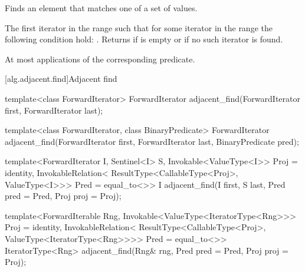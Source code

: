 \begin{itemdescr}
\pnum
\effects
Finds an element that matches one of a set of values.

\pnum
\returns
The first iterator
in the range 
such that for some
iterator
in the range 
the following condition hold:
.
Returns 
if  is empty or if
no such iterator is found.

\pnum
\complexity
At most
applications of the corresponding predicate.
\end{itemdescr}

[alg.adjacent.find]{Adjacent find}

%
\begin{removedblock}
\begin{itemdecl}
template<class ForwardIterator>
  ForwardIterator adjacent_find(ForwardIterator first, ForwardIterator last);

template<class ForwardIterator, class BinaryPredicate>
  ForwardIterator adjacent_find(ForwardIterator first, ForwardIterator last,
                              BinaryPredicate pred);
\end{itemdecl}
\end{removedblock}
\begin{addedblock}
\begin{itemdecl}
template<ForwardIterator I, Sentinel<I> S,
    Invokable<ValueType<I>> Proj = identity,
    InvokableRelation<
      ResultType<CallableType<Proj>, ValueType<I>>> Pred = equal_to<>>
  I
    adjacent_find(I first, S last, Pred pred = Pred{},
                  Proj proj = Proj{});

template<ForwardIterable Rng,
    Invokable<ValueType<IteratorType<Rng>>> Proj = identity,
    InvokableRelation<
      ResultType<CallableType<Proj>, ValueType<IteratorType<Rng>>>> Pred = equal_to<>>
  IteratorType<Rng>
    adjacent_find(Rng& rng, Pred pred = Pred{}, Proj proj = Proj{});
\end{itemdecl}
\end{addedblock}

